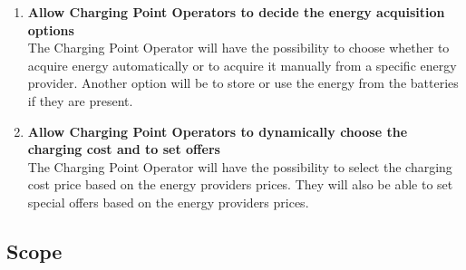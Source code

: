 \begin{enumerate}[label=$\bullet$ \textbf{G\arabic*:}]
        \item \textbf{Allow Charging Point Operators to decide the energy acquisition options}
        \\
        The Charging Point Operator will have the possibility to choose whether to acquire energy automatically or to acquire it manually from a specific energy provider.
        Another option will be to store or use the energy from the batteries if they are present.
        \item \textbf{Allow Charging Point Operators to dynamically choose the charging cost and to set offers}
        \\
        The Charging Point Operator will have the possibility to select the charging cost price based on the energy providers prices. They will also be able to set special offers based on the energy providers prices.
\end{enumerate}

\subsection{Scope}
